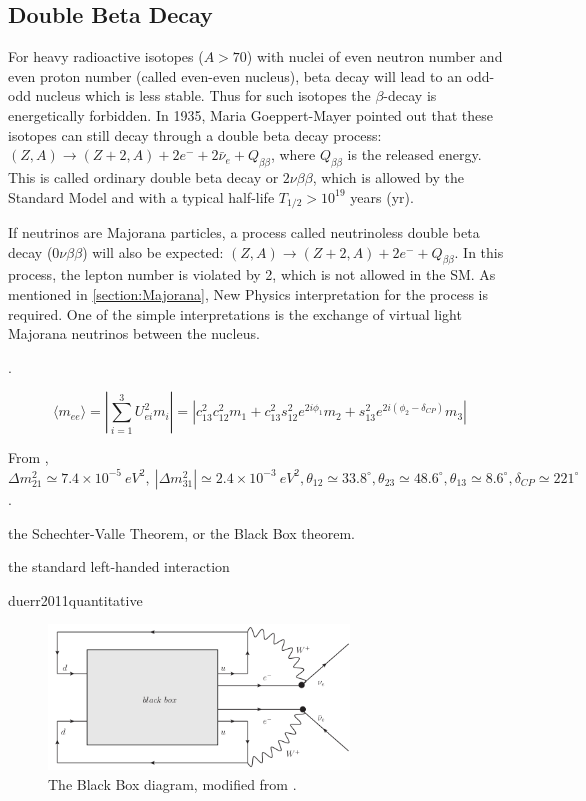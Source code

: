\subsection{Double Beta Decay}

For heavy radioactive isotopes ($A>70$) with nuclei of even neutron number and even proton number (called even-even nucleus), beta decay will lead to an odd-odd nucleus which is less stable. Thus for such isotopes the $\beta$-decay is energetically forbidden. In 1935, Maria Goeppert-Mayer pointed out that these isotopes can still decay through a double beta decay process: $(Z,A) \to (Z+2,A)+2e^{-}+2\bar{\nu}_e+Q_{\beta\beta}$, where $Q_{\beta\beta}$ is the released energy. This is called ordinary double beta decay or $2\nu\beta\beta$, which is allowed by the Standard Model and with a typical half-life $T_{1/2}>10^{19}$ years (yr)\cite{povh2008particles,martin2019nuclear}.

If neutrinos are Majorana particles, a process called neutrinoless double beta decay ($0\nu\beta\beta$) will also be expected: $(Z,A) \to (Z+2,A)+2e^{-}+Q_{\beta\beta}$. In this process, the lepton number is violated by 2, which is not allowed in the SM. As mentioned in \ref{section:Majorana}, New Physics interpretation for the process is required. One of the simple interpretations is the exchange of virtual light Majorana neutrinos between the nucleus. 

\cite{dolinski2019neutrinoless}.

\begin{equation}
\langle m_{ee} \rangle = |\sum_{i=1}^3 U^2_{ei}m_i|= |c^2_{13}c^2_{12}m_1+c^2_{13}s^2_{12}e^{2i\phi_1}m_2+s^2_{13}e^{2i(\phi_2-\delta_{CP})}m_3|
\end{equation}

From \cite{pdg2018}, $\Delta m^2_{21}\simeq 7.4\times 10^{-5}~eV^2,~|\Delta m^2_{31}|\simeq 2.4\times 10^{-3}~eV^2 ,\theta_{12}\simeq 33.8^\circ, \theta_{23}\simeq 48.6^\circ,\theta_{13}\simeq 8.6^\circ, \delta_{CP}\simeq 221^\circ$.

the Schechter-Valle Theorem, or the Black Box theorem.

the standard left-handed interaction

duerr2011quantitative  




\begin{figure}[htbp]
	\centering	
	\includegraphics[width=8cm]{blackbox.png}
	\caption{ The Black Box diagram, modified from \cite{schechter1982neutrinoless}.}
	\label{blackbox}
\end{figure}



